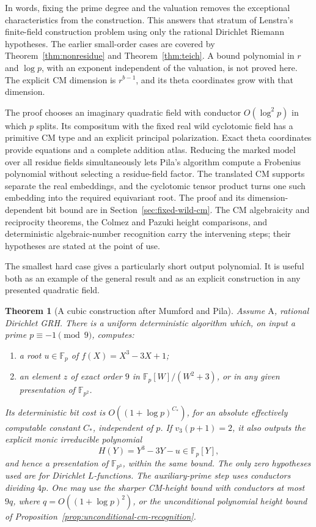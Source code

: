 \documentclass[11pt]{article}
\newtheorem{theorem}{Theorem}[section]
\theoremstyle{definition}
\theoremstyle{remark}
\begin{document}
In words, fixing the prime degree and the valuation removes the
exceptional characteristics from the construction. This answers that
stratum of Lenstra's finite-field construction problem using only
the rational Dirichlet Riemann hypotheses. The earlier small-order
cases are covered by Theorem~\ref{thm:nonresidue} and
Theorem~\ref{thm:teich}. A bound polynomial in \(r\) and
\(\log p\), with an exponent independent of the valuation,
is not proved here. The explicit CM dimension is \(r^{b-1}\),
and its theta coordinates grow with that dimension.

The proof chooses an imaginary quadratic field with conductor
\(O(\log^2p)\) in which \(p\) splits. Its compositum with
the fixed real wild cyclotomic field has a primitive CM type and an
explicit principal polarization. Exact theta coordinates provide
equations and a complete addition atlas. Reducing the marked model
over all residue fields simultaneously lets Pila's algorithm compute
a Frobenius polynomial without selecting a residue-field factor.
The translated CM supports separate the real embeddings, and the
cyclotomic tensor product turns one such embedding into the required
equivariant root. The proof and its dimension-dependent bit bound
are in Section~\ref{sec:fixed-wild-cm}. The CM algebraicity and
reciprocity theorems, the Colmez and Pazuki height comparisons, and
deterministic algebraic-number recognition carry the intervening
steps; their hypotheses are stated at the point of use.

The smallest hard case gives a particularly short output polynomial.
It is useful both as an example of the general result and as an
explicit construction in any presented quadratic field.

\begin{theorem}[A cubic construction after Mumford and Pila]\label{thm:dirichlet-ninth-root-cubic}
Assume \(\mathrm A\), rational Dirichlet GRH. There is a uniform
deterministic algorithm which, on input a prime
\(p\equiv-1\pmod9\), computes:
\begin{enumerate}
\item a root \(u\in\mathbb F_p\) of
\(f(X)=X^3-3X+1\);
\item an element \(z\) of exact order \(9\) in
\(\mathbb F_p[W]/(W^2+3)\), or in any given presentation of
\(\mathbb F_{p^2}\).
\end{enumerate}
Its deterministic bit cost is \(O((1+\log p)^{C_*})\), for an
absolute effectively computable constant \(C_*\), independent of
\(p\). If \(v_3(p+1)=2\), it also outputs the explicit monic
irreducible polynomial
\[
                 H(Y)=Y^3-3Y-u\in\mathbb F_p[Y],
\]
and hence a presentation of \(\mathbb F_{p^3}\), within the same
bound. The only zero hypotheses used are for Dirichlet \(L\)-functions.
The auxiliary-prime step uses conductors dividing \(4p\). One may
use the sharper CM-height bound with conductors at most \(9q\),
where \(q=O((1+\log p)^2)\), or the unconditional polynomial
height bound of Proposition~\ref{prop:unconditional-cm-recognition}.
\end{theorem}
\end{document}
